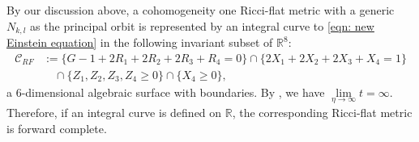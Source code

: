 \documentclass[11pt,letterpaper]{amsart}
\theoremstyle{definition}
\numberwithin{equation}{section}
\begin{document}
By our discussion above, a cohomogeneity one Ricci-flat metric with a generic $N_{k,l}$ as the principal orbit is represented by an integral curve to \eqref{eqn: new Einstein equation} in the following invariant subset of $\mathbb{R}^8$:
\begin{equation}
\label{eqn: new conservation set}
\begin{split}
\mathcal{C}_{RF}&:=\{ G-1+2R_1+2R_2+2R_3+R_4=0\}\cap \{2X_1+2X_2+2X_3+X_4=1\}\\
&\quad \cap \{Z_1,Z_2,Z_3,Z_4\geq 0\}\cap \{X_4\geq 0\},
\end{split}
\end{equation}
 a $6$-dimensional algebraic surface with boundaries. By \cite[Lemma 5.1]{buzano_family_2015}, we have $\lim\limits_{\eta\to \infty} t=\infty$. Therefore, if an integral curve is defined on $\mathbb{R}$, the corresponding Ricci-flat metric is forward complete.
\end{document}
